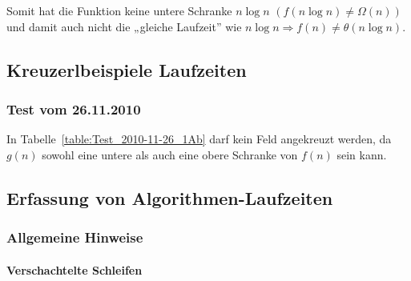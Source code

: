 \documentclass[a4paper, 12pt]{article}
\begin{document}
Somit hat die Funktion keine untere Schranke $n \log n$	 $\left(f(n \log n)≠ Ω(n)\right)$ und damit auch nicht die „gleiche Laufzeit” wie $n \log n \Rightarrow f(n) ≠ θ(n \log n)$.

\subsection{Kreuzerlbeispiele Laufzeiten}

\subsubsection{Test vom 26.11.2010}

\begin{table}[htbp]

\caption{Beispiel 1b) der Gruppe A}
\label{table:Test_2010-11-26_1Ab}
	\begin{center}
\end{center}
\end{table}

In Tabelle~\ref{table:Test_2010-11-26_1Ab} darf kein Feld angekreuzt werden, da $g\left(n\right)$ sowohl eine untere als auch eine obere Schranke von  $f\left(n\right)$ sein kann.
		
\subsection{Erfassung von Algorithmen-Laufzeiten}

\subsubsection{Allgemeine Hinweise}

\paragraph{Verschachtelte Schleifen}~\\
\end{document}
